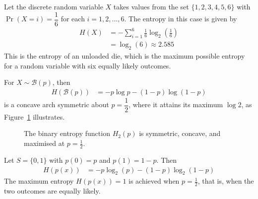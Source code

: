 \documentclass[a4paper, 12pt]{book}
\begin{document}
\begin{example}
    Let the discrete random variable $X$ takes values from the set $\{1,2,3,4,5,6\}$ with $\Pr(X = i) = \dfrac{1}{6}$ for each $i = 1, 2, \ldots, 6$. The entropy in this case is given by 
    \begin{align}
        H(X) &= -\sum_{i=1}^6 \frac{1}{6}\log_2\left(\frac{1}{6}\right) \\
            &= \log_2(6) \approx 2.585
    \end{align}
    This is the entropy of an unloaded die, which is the maximum possible entropy for a random variable with six equally likely outcomes.
\end{example}

\begin{example}
    For $X \sim \mathscr{B}(p)$, then
    \begin{align}
        H(\mathscr{B}(p)) &= -p\log p-(1-p)\log(1-p)
    \end{align}
    is a concave arch symmetric about $p= \dfrac{1}{2}$, where it attains its maximum $\log 2$, as Figure~\ref{fig:binary-entropy} illustrates.
\end{example}

\begin{figure}[htbp]
\centering
{}
\caption{The binary entropy function $H_2(p)$ is symmetric, concave, and maximised at $p= \frac{1}{2}$.}
\label{fig:binary-entropy}
\end{figure}

\begin{example}
    Let $S = \{0,1\}$ with $p(0) = p$ and $p(1) = 1 - p$. Then
    \begin{align}
        H(p(x)) &= -p\log_2(p) - (1-p)\log_2(1-p)
    \end{align}
    The maximum entropy $H(p(x)) = 1$ is achieved when $p = \tfrac{1}{2}$, that is, when the two outcomes are equally likely.
\end{example}
\end{document}
